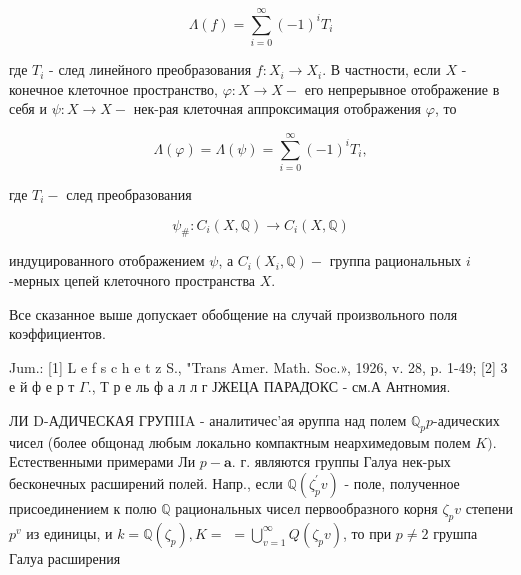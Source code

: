 \documentclass[10pt]{article}
\begin{document}
\[

\Lambda(f)=\sum_{i=0}^{\infty}(-1)^{i} T_{i}

\]



где $T_{i}$ - след линейного преобразования $f: X_{i} \rightarrow X_{i}$. В частности, если $X$ - конечное клеточное пространство, $\varphi: X \rightarrow X-$ его непрерывное отображение в себя и $\psi: X \rightarrow X-$ нек-рая клеточная аппроксимация отображения $\varphi$, то



\[

\Lambda(\varphi)=\Lambda(\psi)=\sum_{i=0}^{\infty}(-1)^{i} T_{i},

\]



где $T_{i}-$ след преобразования



\[

\psi_{\#}: C_{i}(X, \mathbb{Q}) \rightarrow C_{i}(X, \mathbb{Q})

\]



индуцированного отображением $\psi$, а $C_{i}\left(X_{i}, \mathbb{Q}\right)-$ группа рациональных $i$-мерных цепей клеточного пространства $X$.



Все сказанное выше допускает обобщение на случай произвольного поля коэффициентов.



Jum.: [1] L e f s c h e t z S., "Trans Amer. Math. Soc.», 1926, v. 28, p. 1-49; [2] 3 е й ф е р т $\Gamma .$, Т р е ль ф а л л г ЈЖЕЦА ПАРАД̈ОКС - см.А Антномия.



ЛИ D-АДИЧЕСКАЯ ГРУПIIA - аналитичес'ая әруппа над полем $\mathbb{Q}_{p} p$-адических чисел (более общонад любым локально компактным неархимедовым полем $K)$. Естественными примерами Ли $p-\mathbf{a}$. г. являются группы Галуа нек-рых бесконечных расширений полей. Напр., если $\mathbb{Q}\left(\zeta_{p}^{\prime} v\right)$ - поле, полученное присоединением к полю $\mathbb{Q}$ рациональных чисел первообразного корня $\zeta_{p} v$ степени $p^{v}$ из единицы, и $k=\mathbb{Q}\left(\zeta_{p}\right), K=$ $=\bigcup_{v=1}^{\infty} Q\left(\zeta_{p} v\right)$, то при $p \neq 2$ грушпа Галуа расширения
\end{document}
